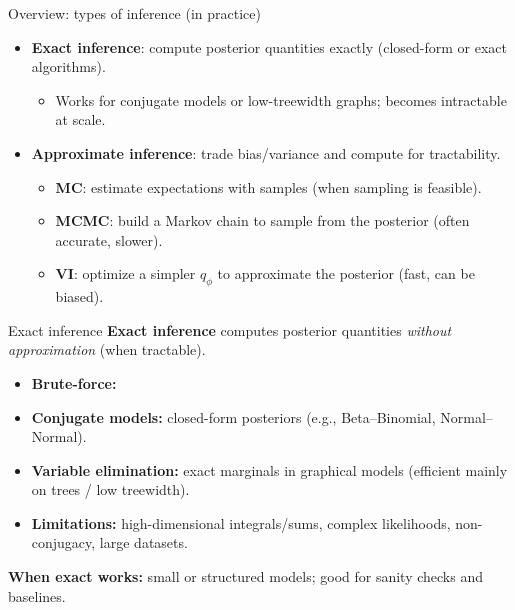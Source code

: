 \documentclass[aspectratio=169]{beamer}
\begin{document}
\begin{frame}{Overview: types of inference (in practice)}
  \begin{itemize}
    \item \textbf{Exact inference}:
      compute posterior quantities exactly (closed-form or exact algorithms).
      \\[-0.2em]\begin{itemize}
        \item Works for conjugate models or low-treewidth graphs; becomes intractable at scale.
      \end{itemize}
    \item \textbf{Approximate inference}:
      trade bias/variance and compute for tractability.
      \\[-0.2em]\begin{itemize}
        \item \textbf{MC}: estimate expectations with samples (when sampling is feasible).
        \item \textbf{MCMC}: build a Markov chain to sample from the posterior (often accurate, slower).
        \item \textbf{VI}: optimize a simpler $q_\phi$ to approximate the posterior (fast, can be biased).
      \end{itemize}
  \end{itemize}
\end{frame}

\begin{frame}{Exact inference}
  \textbf{Exact inference} computes posterior quantities \emph{without approximation} (when tractable).
  \begin{itemize}
  \item \textbf{Brute-force:}
    \item \textbf{Conjugate models:} closed-form posteriors (e.g., Beta--Binomial, Normal--Normal).
    \item \textbf{Variable elimination:} exact marginals in graphical models
          (efficient mainly on trees / low treewidth).
    \item \textbf{Limitations:} high-dimensional integrals/sums, complex likelihoods,
          non-conjugacy, large datasets.
  \end{itemize}

  \vspace{0.4em}
  \textbf{When exact works:} small or structured models; good for sanity checks and baselines.
\end{frame}
\end{document}
